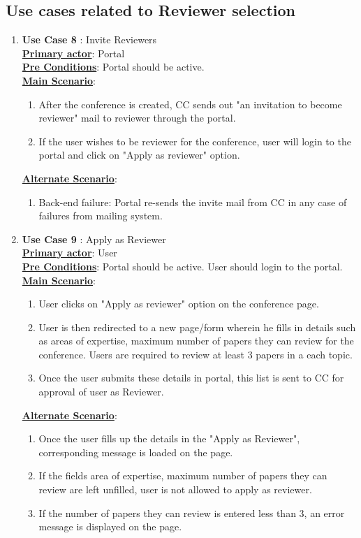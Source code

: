 \documentclass[english,a4paper,12pt]{report}
\begin{document}
\subsection{Use cases related to Reviewer selection}
\begin{enumerate}
    \item \textbf{Use Case 8 }: Invite Reviewers \\
\underline{\textbf{Primary actor}}: Portal\\
\underline{\textbf{Pre Conditions}}: Portal should be active.\\
\underline{\textbf{Main Scenario}}:
\begin{enumerate}
    \item After the conference is created, CC sends out "an invitation to become reviewer" mail to reviewer through the portal.
    \item If the user wishes to be reviewer for the conference, user will login to the portal and click on "Apply as reviewer" option.
\end{enumerate}
\underline{\textbf{Alternate Scenario}}:
\begin{enumerate}
    \item Back-end failure: Portal re-sends the invite mail from CC in any case of failures from mailing system.
\end{enumerate}

\item \textbf{Use Case 9 }: Apply as Reviewer\\
\underline{\textbf{Primary actor}}: User\\
\underline{\textbf{Pre Conditions}}: Portal should be active. User should login to the portal.\\
\underline{\textbf{Main Scenario}}:
\begin{enumerate}
    \item User clicks on "Apply as reviewer" option on the conference page.
    \item User is then redirected to a new page/form wherein he fills in details such as areas of expertise, maximum number of papers they can review for the conference. Users are required to review at least 3 papers in a each topic.
    \item Once the user submits these details in portal, this list is sent to CC for approval of user as Reviewer.
\end{enumerate}
\underline{\textbf{Alternate Scenario}}:
\begin{enumerate}
    \item Once the user fills up the details in the "Apply as Reviewer", corresponding message is loaded on the page.
    \item If the fields area of expertise, maximum number of papers they can review are left unfilled, user is not allowed to apply as reviewer.
    \item If the number of papers they can review is entered less than 3, an error message is displayed on the page.
\end{enumerate}
\end{enumerate}
\end{document}
